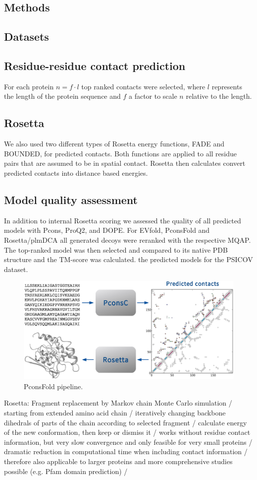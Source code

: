 \documentclass{bioinfo}
\begin{document}
\begin{methods}
\section{Methods}
\subsection{Datasets}
\cite[]{jones_PSICOV:_2012}
\subsection{Residue-residue contact prediction}
For each protein $n = f \cdot l$ top ranked contacts were selected, where $l$ represents the length of the protein sequence and $f$ a factor to scale $n$ relative to the length.
\subsection{Rosetta}
We also used two different types of Rosetta energy functions, FADE and BOUNDED, for predicted contacts. Both functions are applied to all residue pairs that are assumed to be in spatial contact. Rosetta then calculates convert predicted contacts into distance based energies. 
\subsection{Model quality assessment}
In addition to internal Rosetta scoring we assessed the quality of all predicted models with Pcons, ProQ2, and DOPE. For EVfold, PconsFold and Rosetta/plmDCA all generated decoys were reranked with the respective MQAP. The top-ranked model was then selected and compared to its native PDB structure and the TM-score was calculated. the predicted models for the PSICOV dataset. 
\begin{figure}[!tpb]%
    \centerline{\includegraphics[scale=0.37]{figures/pipeline.eps}}
\caption{PconsFold pipeline.}\label{fig:main}
\end{figure}
Rosetta: Fragment replacement by Markov chain Monte Carlo simulation / starting from extended amino acid chain / iteratively changing backbone dihedrals of parts of the chain according to selected fragment / calculate energy of the new conformation, then keep or dismiss it / works without residue contact information, but very slow convergence and only feasible for very small proteins / dramatic reduction in computational time when including contact information / therefore also applicable to larger proteins and more comprehensive studies possible (e.g. Pfam domain prediction) / \\



\end{methods}
\end{document}
